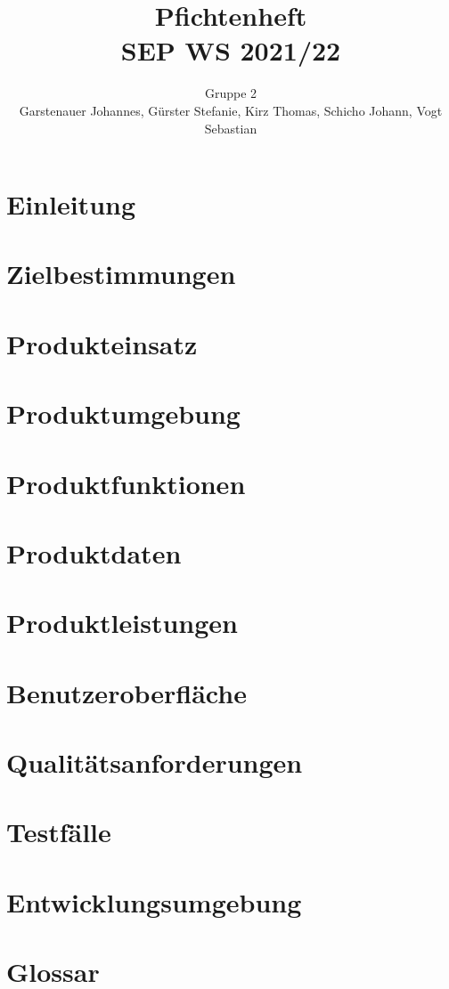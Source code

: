 \documentclass[a4paper,11pt,parskip=half-]{article}
\newcommand{\doubletitle}[2]{\title{#1 \\ [1ex] \normalsize #2}}
\newcommand{\extauthor}[2]{\author{#1 \\ \normalsize #2}}
\begin{document}
	\doubletitle{Pfichtenheft}{SEP WS 2021/22}

	\extauthor{Gruppe 2}{Garstenauer Johannes, Gürster Stefanie, Kirz Thomas, Schicho Johann, Vogt Sebastian}


	\maketitle
	\tableofcontents
	\listoftodos


	\newpage

	\section{Einleitung}
	

	\section{Zielbestimmungen}
	

	\section{Produkteinsatz}
	

	\section{Produktumgebung}
	

	\section{Produktfunktionen}
	

	\section{Produktdaten}
	

	\section{Produktleistungen}
	

	\section{Benutzeroberfläche}
	

	\section{Qualitätsanforderungen}
	

	\section{Testfälle}
	

	\section{Entwicklungsumgebung}
	

	\section{Glossar}
	
\end{document}
